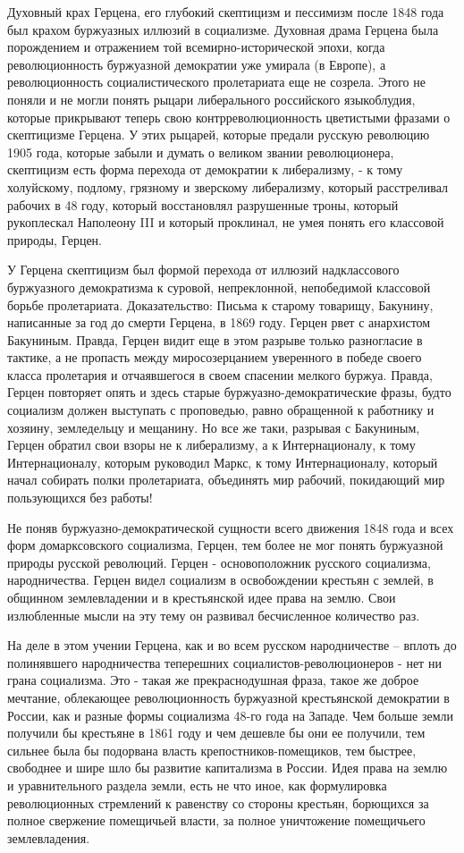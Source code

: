 \documentclass[12pt]{article}
\newcommand{\parnum}{(\arabic{parcount})}
\newcounter{parcount}
\newenvironment{parnumbers}{%
  \par%
  \everypar{\noindent \stepcounter{parcount}\marginpar[]{\parnum}}%
}{}
\begin{document}
\begin{parnumbers}
Духовный крах Герцена, его глубокий скептицизм и пессимизм после 1848 года был крахом буржуазных иллюзий в социализме. Духовная драма Герцена была порождением и отражением той всемирно-исторической эпохи, когда революционность буржуазной демократии уже умирала (в Европе), а революционность социалистического пролетариата еще не созрела. Этого не поняли и не могли понять рыцари либерального российского языкоблудия, которые прикрывают теперь свою контрреволюционность цветистыми фразами о скептицизме Герцена. У этих рыцарей, которые предали русскую революцию 1905 года, которые забыли и думать о великом звании революционера, скептицизм есть форма перехода от демократии к либерализму, - к тому холуйскому, подлому, грязному и зверскому либерализму, который расстреливал рабочих в 48 году, который восстановлял разрушенные троны, который рукоплескал Наполеону III и который проклинал, не умея понять его классовой природы, Герцен.

У Герцена скептицизм был формой перехода от иллюзий надклассового буржуазного демократизма к суровой, непреклонной, непобедимой классовой борьбе пролетариата. Доказательство: Письма к старому товарищу, Бакунину, написанные за год до смерти Герцена, в 1869 году. Герцен рвет с анархистом Бакуниным. Правда, Герцен видит еще в этом разрыве только разногласие в тактике, а не пропасть между миросозерцанием уверенного в победе своего класса пролетария и отчаявшегося в своем спасении мелкого буржуа. Правда, Герцен повторяет опять и здесь старые буржуазно-демократические фразы, будто социализм должен выступать с проповедью, равно обращенной к работнику и хозяину, земледельцу и мещанину. Но все же таки, разрывая с Бакуниным, Герцен обратил свои взоры не к либерализму, а к Интернационалу, к тому Интернационалу, которым руководил Маркс, к тому Интернационалу, который начал собирать полки пролетариата, объединять мир рабочий, покидающий мир пользующихся без работы!

Не поняв буржуазно-демократической сущности всего движения 1848 года и всех форм домарксовского социализма, Герцен, тем более не мог понять буржуазной природы русской революций. Герцен - основоположник русского социализма, народничества. Герцен видел социализм в освобождении крестьян с землей, в общинном землевладении и в крестьянской идее права на землю. Свои излюбленные мысли на эту тему он развивал бесчисленное количество раз.

На деле в этом учении Герцена, как и во всем русском народничестве – вплоть до полинявшего народничества теперешних социалистов-революционеров - нет ни грана социализма. Это - такая же прекраснодушная фраза, такое же доброе мечтание, облекающее революционность буржуазной крестьянской демократии в России, как и разные формы социализма 48-го года на Западе. Чем больше земли получили бы крестьяне в 1861 году и чем дешевле бы они ее получили, тем сильнее была бы подорвана власть крепостников-помещиков, тем быстрее, свободнее и шире шло бы развитие капитализма в России. Идея права на землю и уравнительного раздела земли, есть не что иное, как формулировка революционных стремлений к равенству со стороны крестьян, борющихся за полное свержение помещичьей власти, за полное уничтожение помещичьего землевладения.


\end{parnumbers}
\end{document}
